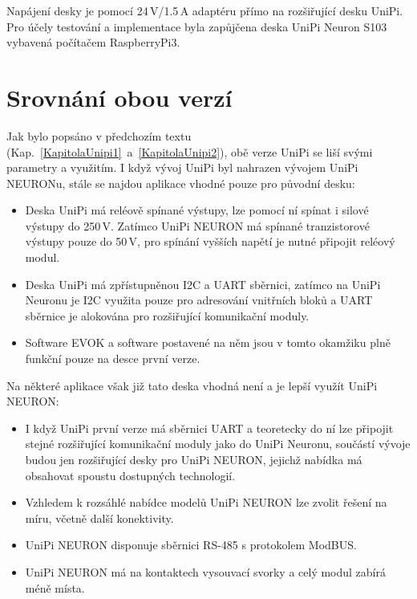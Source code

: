 Napájení desky je pomocí 24\,V/1.5\,A adaptéru přímo na rozšiřující desku UniPi. Pro účely testování a implementace byla zapůjčena deska UniPi Neuron S103 vybavená počítačem RaspberryPi3.



 
 


\newpage
\section{Srovnání obou verzí}

Jak bylo popsáno v předchozím textu (Kap.~\ref{KapitolaUnipi1}~a~\ref{KapitolaUnipi2}), obě verze UniPi se liší svými parametry a využitím. I když vývoj UniPi byl nahrazen vývojem UniPi NEURONu, stále se najdou aplikace vhodné pouze pro původní desku:


\begin{itemize}
	\item Deska UniPi má reléově spínané výstupy, lze pomocí ní spínat i silové výstupy do 250\,V. Zatímco UniPi NEURON má spínané tranzistorové výstupy pouze do 50\,V, pro spínání vyšších napětí je nutné připojit reléový modul.
	\item Deska UniPi má zpřístupněnou I2C a UART sběrnici, zatímco na UniPi Neuronu je I2C využita pouze pro adresování vnitřních bloků a UART sběrnice je alokována pro rozšiřující komunikační moduly.
	\item Software EVOK a software postavené na něm jsou v tomto okamžiku plně funkční pouze na desce první verze.	
\end{itemize}

Na některé aplikace však již tato deska vhodná není a je lepší využít UniPi NEURON:

\begin{itemize}
	\item I když UniPi první verze má sběrnici UART a teoretecky do ní lze připojit stejné rozšiřující komunikační moduly jako do UniPi Neuronu, součástí vývoje budou jen rozšiřující desky pro UniPi NEURON, jejichž nabídka má obsahovat spoustu dostupných technologií.
	\item Vzhledem k rozsáhlé nabídce modelů UniPi NEURON lze zvolit řešení na míru, včetně další konektivity.
	\item UniPi NEURON disponuje sběrnici RS-485 s protokolem ModBUS.
	\item UniPi NEURON má na kontaktech vysouvací svorky a celý modul zabírá méně místa.	
\end{itemize}


